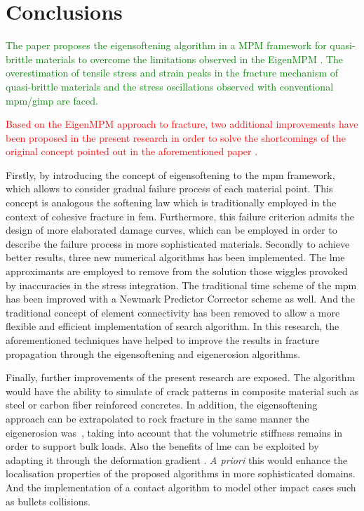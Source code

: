 \message{ !name(2020_EFM_MPM_Eigensoftening.tex)}\documentclass[preprint,12pt,a4paper]{elsarticle}
\newcommand{\PNA}[1]{
  \textcolor{red}{{#1}}
}
\newcommand{\DM}[1]{
  \textcolor{green}{{#1}}
}
\begin{document}

\section{Conclusions}
\label{sec:4}

\DM{The paper proposes the eigensoftening algorithm in a \acrshort{MPM} framework for quasi-brittle materials to overcome the limitations observed in the EigenMPM \cite{Zhang_EE_2020}. The overestimation of tensile 
stress and strain peaks in the fracture mechanism of quasi-brittle
materials and the stress oscillations observed with conventional
\acrshort{mpm}/\acrshort{gimp} are faced.} \PNA{Based on the
EigenMPM approach to fracture, two additional improvements have been proposed in the present research in order to solve the shortcomings of the original concept pointed out in the aforementioned paper \cite{Zhang_EE_2020}.}

Firstly, by introducing the concept of eigensoftening to the \acrshort{mpm} framework,
which allows to consider gradual failure process of each material point. This concept is analogous the softening law which is traditionally employed in the context
of cohesive fracture in \acrshort{fem}. Furthermore, this failure
criterion admits the design of more elaborated damage curves, which
can be employed in order to describe the failure process in more
sophisticated materials. Secondly to achieve better results, three new
numerical algorithms has been implemented. The \acrshort{lme}
approximants are employed to remove from
the solution those wiggles provoked by inaccuracies in the stress
integration. The traditional time scheme of the
\acrshort{mpm} has been improved with a Newmark Predictor Corrector
scheme as well. And the traditional concept of element connectivity
has been removed to allow a more flexible and efficient implementation of search
algorithm. In this research, the aforementioned techniques have helped
to improve the results in fracture propagation through the
eigensoftening and eigenerosion algorithms.

Finally, further improvements of the present research are exposed. The
algorithm would have the ability to simulate of crack patterns in
composite material such as steel or carbon fiber reinforced
concretes\cite{Navas_2018_ES,Ruiz2019}. In addition, the eigensoftening
approach can be extrapolated to rock fracture in the same manner the
eigenerosion was~\cite{Wang2017}, taking into account that the
volumetric stiffness remains in order to support bulk loads. Also the
benefits of \acrshort{lme} can be exploited by adapting it through the
deformation gradient \cite{Kochmann2019}. \textit{A priori} this would
enhance the localisation properties of the proposed algorithms in more
sophisticated domains. And the implementation of a contact algorithm to model other impact cases such as bullets collisions. 
\end{document}
